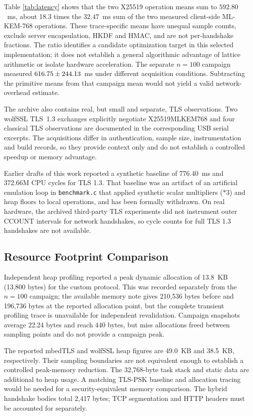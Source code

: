 \documentclass[journal, 10pt]{IEEEtran}
\begin{document}
Table \ref{tab:latency} shows that the two X25519 operation means sum to $592.80$~ms, about 18.3 times the $32.47$~ms sum of the two measured client-side ML-KEM-768 operations. These trace-specific means have unequal sample counts, exclude server encapsulation, HKDF and HMAC, and are not per-handshake fractions. The ratio identifies a candidate optimization target in this selected implementation; it does not establish a general algorithmic advantage of lattice arithmetic or isolate hardware acceleration. The separate $n=100$ campaign measured $616.75\pm244.13$~ms under different acquisition conditions. Subtracting the primitive means from that campaign mean would not yield a valid network-overhead estimate.

The archive also contains real, but small and separate, TLS observations. Two wolfSSL TLS~1.3 exchanges explicitly negotiate X25519MLKEM768 and four classical TLS observations are documented in the corresponding USB serial excerpts. The acquisitions differ in authentication, sample size, instrumentation and build records, so they provide context only and do not establish a controlled speedup or memory advantage.

Earlier drafts of this work reported a synthetic baseline of 776.40~ms and 372.66M CPU cycles for TLS 1.3. That baseline was an artifact of an artificial emulation loop in \texttt{benchmark.c} that applied synthetic scalar multipliers ($*3$) and heap floors to local operations, and has been formally withdrawn. On real hardware, the archived third-party TLS experiments did not instrument outer CCOUNT intervals for network handshakes, so cycle counts for full TLS 1.3 handshakes are not available.


\subsection{Resource Footprint Comparison}
Independent heap profiling reported a peak dynamic allocation of 13.8~KB (13,800 bytes) for the custom protocol. This was recorded separately from the $n=100$ campaign; the available memory note gives 210,536 bytes before and 196,736 bytes at the reported allocation point, but the complete transient profiling trace is unavailable for independent revalidation. Campaign snapshots average 22.24 bytes and reach 440 bytes, but miss allocations freed between sampling points and do not provide a campaign peak.

The reported mbedTLS and wolfSSL heap figures are 49.0~KB and 38.5~KB, respectively. Their sampling boundaries are not equivalent enough to establish a controlled peak-memory reduction. The 32,768-byte task stack and static data are additional to heap usage. A matching TLS-PSK baseline and allocation tracing would be needed for a security-equivalent memory comparison. The hybrid handshake bodies total 2,417 bytes; TCP segmentation and HTTP headers must be accounted for separately.
\end{document}
